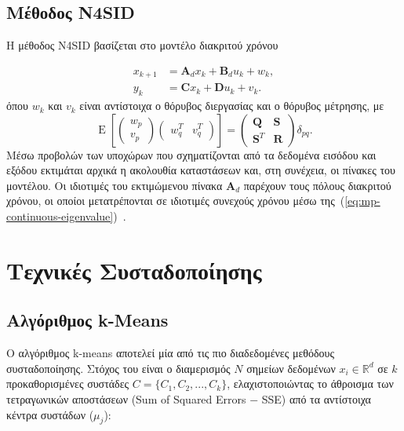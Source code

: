 \subsection{Μέθοδος N4SID}
Η μέθοδος N4SID βασίζεται στο μοντέλο διακριτού χρόνου

\begin{equation}
\begin{aligned}
x_{k+1}&=\mathbf{A}_d x_k+\mathbf{B}_d u_k+w_k,\\
y_k&=\mathbf{C}x_k+\mathbf{D}u_k+v_k.
\end{aligned}
\label{eq:n4sid-state-space}
\end{equation}
όπου $w_k$ και $v_k$ είναι αντίστοιχα ο θόρυβος διεργασίας και ο θόρυβος μέτρησης, με
\begin{equation}
\operatorname{E}\!\left[
\begin{pmatrix}w_p\\v_p\end{pmatrix}
\begin{pmatrix}w_q^{T}&v_q^{T}\end{pmatrix}
\right]
=
\begin{pmatrix}\mathbf{Q}&\mathbf{S}\\\mathbf{S}^{T}&\mathbf{R}\end{pmatrix}\delta_{pq}.
\label{eq:n4sid-noise-covariance}
\end{equation}
Μέσω προβολών των υποχώρων που σχηματίζονται από τα δεδομένα εισόδου και εξόδου εκτιμάται αρχικά η ακολουθία καταστάσεων και, στη συνέχεια, οι πίνακες του μοντέλου. Οι ιδιοτιμές του εκτιμώμενου πίνακα $\mathbf{A}_d$ παρέχουν τους πόλους διακριτού χρόνου, οι οποίοι μετατρέπονται σε ιδιοτιμές συνεχούς χρόνου μέσω της~(\ref{eq:mp-continuous-eigenvalue})~\cite{modal2018}.



\section{Τεχνικές Συσταδοποίησης}

\subsection{Αλγόριθμος k-Means}

Ο αλγόριθμος k-means αποτελεί μία από τις πιο διαδεδομένες μεθόδους συσταδοποίησης. Στόχος του είναι ο διαμερισμός $N$ σημείων δεδομένων $x_i \in \mathbb{R}^d$ σε $k$ προκαθορισμένες συστάδες $C = \{C_1, C_2, ..., C_k\}$, ελαχιστοποιώντας το άθροισμα των τετραγωνικών αποστάσεων (Sum of Squared Errors $-$ SSE) από τα αντίστοιχα κέντρα συστάδων ($\mu_j$):

